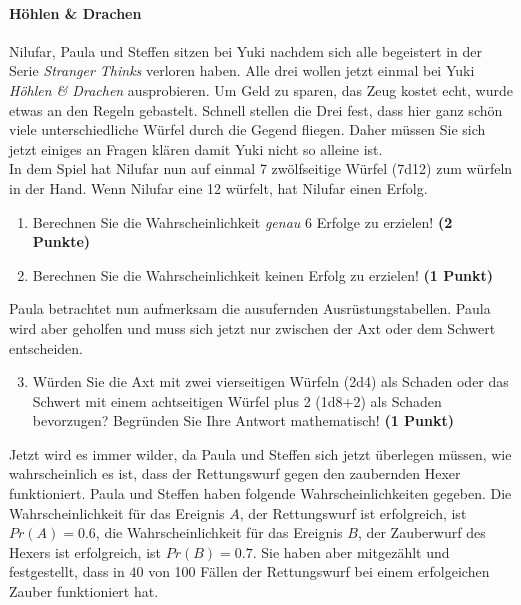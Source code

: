 \documentclass[a4paper, 9pt]{scrartcl}\usepackage[]{graphicx}\usepackage[]{xcolor}
\begin{document}
\paragraph{Höhlen \& Drachen}



Nilufar, Paula und Steffen sitzen bei Yuki nachdem sich alle begeistert in der Serie \textit{Stranger Thinks} verloren haben. Alle drei wollen jetzt einmal bei Yuki \textit{Höhlen \& Drachen} ausprobieren. Um Geld zu sparen, das Zeug kostet echt, wurde etwas an den Regeln gebastelt. Schnell stellen die Drei fest, dass hier ganz schön viele unterschiedliche Würfel durch die Gegend fliegen. Daher müssen Sie sich jetzt einiges an Fragen klären damit Yuki nicht so alleine ist. \\%

In dem Spiel hat Nilufar nun auf einmal 7 zwölfseitige Würfel (7d12) zum würfeln in der Hand. Wenn Nilufar eine 12 würfelt, hat Nilufar einen Erfolg.

\begin{enumerate}
\item Berechnen Sie die Wahrscheinlichkeit \textit{genau} 6 Erfolge zu erzielen!  \textbf{(2 Punkte)}
\item Berechnen Sie die Wahrscheinlichkeit keinen Erfolg zu erzielen! \textbf{(1 Punkt)}
\end{enumerate}

Paula betrachtet nun aufmerksam die ausufernden Ausrüstungstabellen. Paula wird aber geholfen und muss sich jetzt nur zwischen der Axt oder dem Schwert entscheiden.

\begin{enumerate}
  \setcounter{enumi}{2}
\item Würden Sie die Axt mit zwei vierseitigen Würfeln (2d4) als Schaden oder das Schwert mit einem achtseitigen Würfel plus 2 (1d8+2) als Schaden bevorzugen? Begründen Sie Ihre Antwort mathematisch! \textbf{(1 Punkt)}
\end{enumerate}

Jetzt wird es immer wilder, da Paula und Steffen sich jetzt überlegen müssen, wie wahrscheinlich es ist, dass der Rettungswurf gegen den zaubernden Hexer funktioniert. Paula und Steffen haben folgende Wahrscheinlichkeiten gegeben. Die Wahrscheinlichkeit für das Ereignis $A$, der Rettungswurf ist erfolgreich, ist $Pr(A) = 0.6$, die Wahrscheinlichkeit für das Ereignis $B$, der Zauberwurf des Hexers ist erfolgreich, ist $Pr(B) = 0.7$. Sie haben aber mitgezählt und festgestellt, dass in $40$ von 100 Fällen der Rettungswurf bei einem erfolgeichen Zauber funktioniert hat.  
\end{document}
